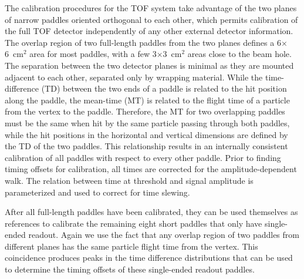 The calibration procedures for the TOF system take advantage of the two
planes of narrow paddles oriented orthogonal to each other, which permits calibration of the full TOF detector independently
of any other external detector information. The overlap region of two full-length paddles from the two planes defines
a 6$\times$6~cm$^2$ area for most paddles, with a few 3$\times$3~cm$^2$ areas close to the beam hole. The separation between the two detector planes is minimal as they are mounted adjacent to each other, separated only by wrapping
material. While the time-difference (TD) between the two ends of a paddle is related to the hit position along the paddle,
the mean-time (MT) is related to the flight time of a particle from the vertex to the paddle. Therefore, the MT for two overlapping
paddles must be the same when hit by the same particle passing through both paddles, while the hit positions in the horizontal and vertical dimensions are defined by the TD of the two paddles. This relationship results in an internally consistent calibration of all paddles with respect to every other paddle. Prior to finding timing offsets for calibration, all times are corrected for the amplitude-dependent walk. The relation between time at threshold and signal amplitude is parameterized and used to correct for time slewing.

After all full-length paddles have been calibrated, they can be used themselves as references to
calibrate the remaining eight short paddles that only have single-ended readout.  Again we use the fact that any overlap region of two paddles from different
planes has the same particle flight time from the vertex. This coincidence produces peaks in the time difference distributions that can be used to determine the timing offsets of these single-ended readout paddles. 

